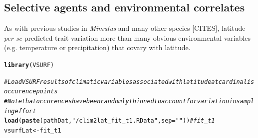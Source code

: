 \documentclass[11pt, oneside]{article}\usepackage[]{graphicx}\usepackage[]{color}
\makeatletter
\newcommand{\hlstr}[1]{\textcolor[rgb]{0.192,0.494,0.8}{#1}}%
\newcommand{\hlcom}[1]{\textcolor[rgb]{0.678,0.584,0.686}{\textit{#1}}}%
\newcommand{\hlstd}[1]{\textcolor[rgb]{0.345,0.345,0.345}{#1}}%
\newcommand{\hlkwb}[1]{\textcolor[rgb]{0.69,0.353,0.396}{#1}}%
\newcommand{\hlkwc}[1]{\textcolor[rgb]{0.333,0.667,0.333}{#1}}%
\newcommand{\hlkwd}[1]{\textcolor[rgb]{0.737,0.353,0.396}{\textbf{#1}}}%
\newenvironment{kframe}{%
 \def\at@end@of@kframe{}%
 \ifinner\ifhmode%
  \def\at@end@of@kframe{\end{minipage}}%
  \begin{minipage}{\columnwidth}%
 \fi\fi%
 \def\FrameCommand##1{\hskip\@totalleftmargin \hskip-\fboxsep
 \colorbox{shadecolor}{##1}\hskip-\fboxsep
     \hskip-\linewidth \hskip-\@totalleftmargin \hskip\columnwidth}%
 \MakeFramed {\advance\hsize-\width
   \@totalleftmargin\z@ \linewidth\hsize
   \@setminipage}}%
 {\par\unskip\endMakeFramed%
 \at@end@of@kframe}
\newenvironment{knitrout}{}{} %
\makeatother
\begin{document}
\subsection*{Selective agents and environmental correlates}

As with previous studies in \textit{Mimulus} and many other species [CITES], latitude \textit{per se} predicted trait variation more than many obvious environmental variables (e.g. temperature or precipitation) that covary with latitude.

\begin{knitrout}
\color{fgcolor}\begin{kframe}
\begin{alltt}
\hlkwd{library}\hlstd{(VSURF)}
\end{alltt}


{\ttfamily\noindent\itshape\color{messagecolor}{\#\# Loading required package: randomForest\\\#\# randomForest 4.6-10\\\#\# Type rfNews() to see new features/changes/bug fixes.\\\#\# Loading required package: rpart\\\#\# Loading required package: doParallel\\\#\# Loading required package: foreach\\\#\# Loading required package: iterators\\\#\# Loading required package: parallel}}\begin{alltt}
  \hlcom{# Load VSURF results of climatic variables associated with latitude at cardinalis occurence points}
  \hlcom{# Note that occurences have been randomly thinned to account for variation in sampling effort}
  \hlkwd{load}\hlstd{(}\hlkwd{paste}\hlstd{(pathDat,} \hlstr{"/clim2lat_fit_t1.RData"}\hlstd{,} \hlkwc{sep} \hlstd{=} \hlstr{""}\hlstd{))} \hlcom{# fit_t1}
  \hlstd{vsurfLat} \hlkwb{<-} \hlstd{fit_t1}


\end{alltt}
\end{kframe}
\end{knitrout}
\end{document}
